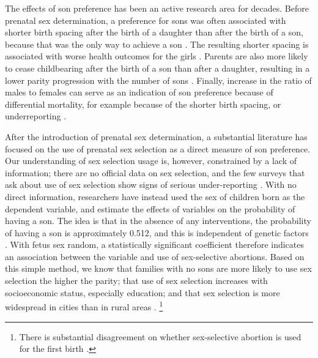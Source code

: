 \documentclass[12pt,letterpaper]{article}
\begin{document}
% 
% 
% 





The effects of son preference has been an active research area for decades.
Before prenatal sex determination, a preference for sons was often associated 
with shorter birth spacing after the birth of a daughter than after the 
birth of a son, because that was the only way to achieve a son 
\citep{Das1987,Rahman1993,Pong1994,Haughton1996,Arnold1997,Soest2012}.
The resulting shorter spacing is associated with worse health outcomes 
for the girls 
\citep{arnold98,Whitworth2002,Rutstein2005,Conde-Agudelo2006}.
Parents are also more likely to cease childbearing after the birth of 
a son than after a daughter, resulting in a lower parity progression
with the number of sons \citep{ben-porath76b,Das1987,Arnold1997,clark00}. 
Finally, increase in the ratio of males to females 
can serve as an indication of son preference because 
of differential mortality, for example because of the shorter
birth spacing, or underreporting \citep{sen90,sen92,Merli2000,anderson08}.

After the introduction of prenatal sex determination, a substantial
literature has focused on the use of prenatal sex selection as a direct 
measure of son preference.
Our understanding of sex selection usage is, however, constrained by a
lack of information;
there are no official data on sex selection, and the few surveys that ask 
about use of sex selection show signs of serious under-reporting \citep{goodkind96}.
With no direct information, researchers have instead used the sex of children 
born as the dependent variable, and estimate the effects of variables on the 
probability of having a son.
The idea is that in the absence of any interventions, the probability of having 
a son is approximately 0.512, and this is independent of genetic 
factors \citep{ben-porath76b,jacobsen99}.
With fetus sex random, a statistically significant coefficient therefore 
indicates an association between the variable and use of sex-selective 
abortions.
Based on this simple method, we know that families with no sons are more likely to
use sex selection the higher the parity;
that use of sex selection increases with socioeconomic status, especially education;
and that sex selection is more widespread in cities than in rural areas 
\citep{retherford03b,jha06,abrevaya09}.%
\footnote{
There is substantial disagreement on whether sex-selective abortion is used for the 
first birth \citep{retherford03b,jha06}.
}
\end{document}
